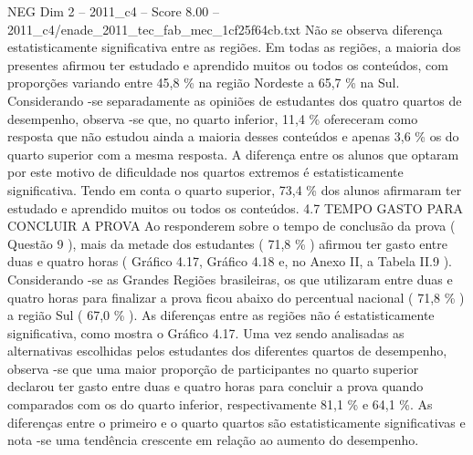 \begin{textsample}{NEG Dim 2 – 2011\_c4 – Score 8.00 – 2011\_c4/enade\_2011\_tec\_fab\_mec\_1cf25f64cb.txt}
Não se observa diferença estatisticamente significativa entre as regiões.
Em todas as regiões, a maioria dos presentes afirmou ter estudado e aprendido muitos ou todos os conteúdos, com proporções variando entre 45,8 \% na região Nordeste a 65,7 \% na Sul.
Considerando -se separadamente as opiniões de estudantes dos quatro quartos de desempenho, observa -se que, no quarto inferior, 11,4 \% ofereceram como resposta que não estudou ainda a maioria desses conteúdos e apenas 3,6 \% os do quarto superior com a mesma resposta.
A diferença entre os alunos que optaram por este motivo de dificuldade nos quartos extremos é estatisticamente significativa.
Tendo em conta o quarto superior, 73,4 \% dos alunos afirmaram ter estudado e aprendido muitos ou todos os conteúdos. 4.7 TEMPO GASTO PARA CONCLUIR A PROVA Ao responderem sobre o tempo de conclusão da prova ( Questão 9 ), mais da metade dos estudantes ( 71,8 \% ) afirmou ter gasto entre duas e quatro horas ( Gráfico 4.17, Gráfico 4.18 e, no Anexo II, a Tabela II.9 ).
Considerando -se as Grandes Regiões brasileiras, os que utilizaram entre duas e quatro horas para finalizar a prova ficou abaixo do percentual nacional ( 71,8 \% ) a região Sul ( 67,0 \% ).
As diferenças entre as regiões não é estatisticamente significativa, como mostra o Gráfico 4.17.
Uma vez sendo analisadas as alternativas escolhidas pelos estudantes dos diferentes quartos de desempenho, observa -se que uma maior proporção de participantes no quarto superior declarou ter gasto entre duas e quatro horas para concluir a prova quando comparados com os do quarto inferior, respectivamente 81,1 \% e 64,1 \%.
As diferenças entre o primeiro e o quarto quartos são estatisticamente significativas e nota -se uma tendência crescente em relação ao aumento do desempenho.

\end{textsample}
